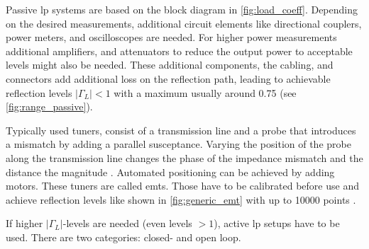 \documentclass[12pt,a4paper,parskip=full,abstract=true,BCOR=12mm,twoside,open=right]{scrreprt}
\providecommand{\abs}[1]{\lvert#1\rvert}
\begin{document}
Passive \gls{lp} systems are based on the block diagram in \cref{fig:load_coeff}. Depending on
the desired measurements, additional circuit elements like directional couplers,
power meters, and oscilloscopes are needed. For higher power measurements additional
amplifiers, and attenuators to reduce the output power to acceptable levels might also
be needed. These additional components, the cabling, and connectors add additional loss
on the reflection path, leading to achievable reflection levels $\abs{\Gamma_L} < 1$ with
a maximum usually around 0.75 \cite{de_groote_introduction_2008} (see \cref{fig:range_passive}).

Typically used tuners, consist of a transmission line and a probe that introduces a mismatch
by adding a parallel susceptance. Varying the position of the probe along the transmission
line changes the phase of the impedance mismatch and the distance the magnitude \cite{hashmi_highly_2011}.
Automated positioning can be achieved by adding motors. These tuners are called \glspl{emt}.
Those have to be calibrated before use and achieve reflection levels like shown in
\cref{fig:generic_emt} with up to 10000 points \cite{ghannouchi_load-pull_2013}.

If higher $\abs{\Gamma_L}$-levels  are needed (even levels $> 1$), active \gls{lp} setups
have to be used. There are two categories: closed- and open loop.
\end{document}
